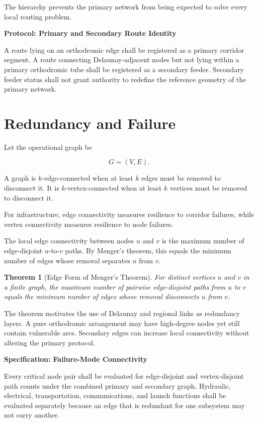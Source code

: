 \documentclass[11pt,fleqn]{book}
\numberwithin{equation}{chapter}
\newenvironment{specification}[1]
  {\begin{specificationEnv}
   \noindent\textbf{Specification: #1}\par\smallskip}
  {\end{specificationEnv}}
\newenvironment{protocol}[1]
  {\begin{protocolEnv}
   \noindent\textbf{Protocol: #1}\par\smallskip}
  {\end{protocolEnv}}
\theoremstyle{plain}
\newtheorem{theorem}{Theorem}[chapter]
\theoremstyle{definition}
\theoremstyle{remark}
\begin{document}
The hierarchy prevents the primary network from being expected to solve every local routing problem.

\begin{protocol}{Primary and Secondary Route Identity}
A route lying on an orthodromic edge shall be registered as a primary corridor segment. A route connecting Delaunay-adjacent nodes but not lying within a primary orthodromic tube shall be registered as a secondary feeder. Secondary feeder status shall not grant authority to redefine the reference geometry of the primary network.
\end{protocol}

\section{Redundancy and Failure}

Let the operational graph be

\begin{equation}
    G=(V,E).
\end{equation}

A graph is \(k\)-edge-connected when at least \(k\) edges must be removed to disconnect it. It is \(k\)-vertex-connected when at least \(k\) vertices must be removed to disconnect it.

For infrastructure, edge connectivity measures resilience to corridor failures, while vertex connectivity measures resilience to node failures.

The local edge connectivity between nodes \(u\) and \(v\) is the maximum number of edge-disjoint \(u\)-to-\(v\) paths. By Menger's theorem, this equals the minimum number of edges whose removal separates \(u\) from \(v\).

\begin{theorem}[Edge Form of Menger's Theorem]
For distinct vertices \(u\) and \(v\) in a finite graph, the maximum number of pairwise edge-disjoint paths from \(u\) to \(v\) equals the minimum number of edges whose removal disconnects \(u\) from \(v\).
\end{theorem}

The theorem motivates the use of Delaunay and regional links as redundancy layers. A pure orthodromic arrangement may have high-degree nodes yet still contain vulnerable arcs. Secondary edges can increase local connectivity without altering the primary protocol.

\begin{specification}{Failure-Mode Connectivity}
Every critical node pair shall be evaluated for edge-disjoint and vertex-disjoint path counts under the combined primary and secondary graph. Hydraulic, electrical, transportation, communications, and launch functions shall be evaluated separately because an edge that is redundant for one subsystem may not carry another.
\end{specification}
\end{document}
